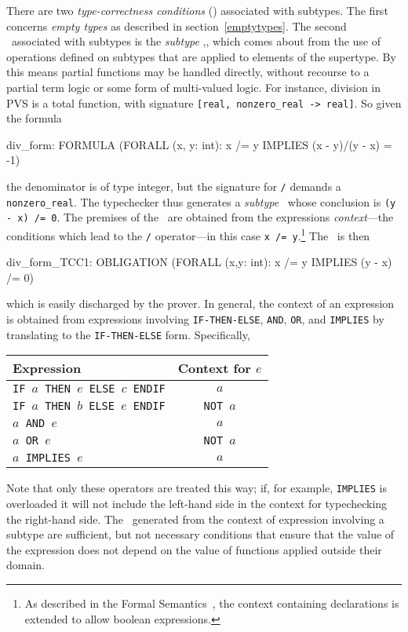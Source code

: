 
There are two \emph{type-correctness conditions} (\tccs) associated with
subtypes.  The first concerns \emph{empty types} as described in section~\ref{emptytypes}.  The
second \tcc\ associated with subtypes is the \emph{subtype}
\tcc,, which comes about from the
use of operations defined on subtypes that are applied to elements of the
supertype.  By this means partial functions may be handled directly,
without recourse to a partial term logic or some form of multi-valued
logic.  For instance, division in PVS is a total function, with signature
\texttt{[real, nonzero\_real -> real]}.  So given the formula
\begin{pvsex}
  div_form: FORMULA (FORALL (x, y: int):
                      x /= y IMPLIES (x - y)/(y - x) = -1)
\end{pvsex}
%
the denominator is of type integer, but the signature for \texttt{/}
demands a \texttt{nonzero\_real}.  The typechecker thus generates a
\emph{subtype} \tcc\ whose conclusion is \texttt{(y - x) /= 0}.  The
premises of the \tcc\ are obtained from the expressions
\emph{context}---the conditions which lead to the
\texttt{/} operator---in this case \texttt{x /= y}.\footnote{As described
in the Formal Semantics~\cite{PVS:semantics}, the context containing
declarations is extended to allow boolean expressions.}  The \tcc\ is then
\begin{pvsex}
  div_form_TCC1: OBLIGATION
    (FORALL (x,y: int): x /= y IMPLIES (y - x) /= 0)
\end{pvsex}
which is easily discharged by the prover.  In general, the context of an
expression is obtained from expressions involving \texttt{IF-THEN-ELSE},
\texttt{AND}, \texttt{OR}, and \texttt{IMPLIES} by translating to the \texttt{IF-THEN-ELSE} form.  Specifically,
\begin{center}
\begin{tabular}{|lc|} \hline
Expression & Context for $e$ \\ \hline
\texttt{IF $a$ THEN $e$ ELSE $c$ ENDIF} & $a$ \\
\texttt{IF $a$ THEN $b$ ELSE $e$ ENDIF} & \texttt{NOT $a$} \\
\texttt{$a$ AND $e$} & $a$ \\
\texttt{$a$ OR $e$} & \texttt{NOT $a$} \\
\texttt{$a$ IMPLIES $e$} & $a$ \\ \hline
\end{tabular}
\end{center}
Note that only these operators are treated this way; if, for example,
\texttt{IMPLIES} is overloaded it will not include the left-hand side in
the context for typechecking the right-hand side.  The \tccs\ generated
from the context of expression involving a subtype are sufficient, but not
necessary conditions that ensure that the value of the expression does
not depend on the value of functions applied outside their domain.

